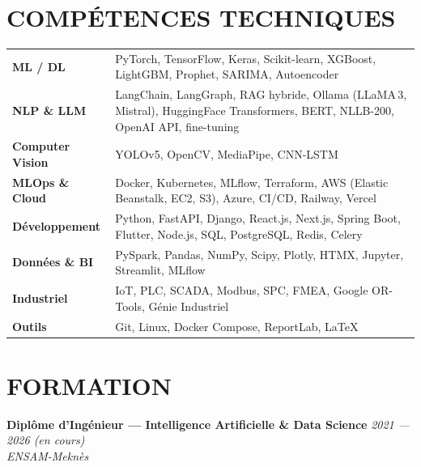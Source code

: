 \documentclass[10pt, a4paper]{article}
\newcommand{\expentry}[3]{%
  \textbf{\normalsize #1} \hfill {\small\color{muted}\textit{#3}}\\
  {\small\color{accent}\textit{#2}}%
}
\begin{document}
\section{COMPÉTENCES TECHNIQUES}

\begin{tabularx}{\linewidth}{@{} l X @{}}
  \textbf{ML / DL}
    & PyTorch, TensorFlow, Keras, Scikit-learn, XGBoost, LightGBM, Prophet, SARIMA, Autoencoder \\[3pt]

  \textbf{NLP \& LLM}
    & LangChain, LangGraph, RAG hybride, Ollama (LLaMA\,3, Mistral), HuggingFace Transformers, BERT, NLLB-200, OpenAI API, fine-tuning \\[3pt]

  \textbf{Computer Vision}
    & YOLOv5, OpenCV, MediaPipe, CNN-LSTM \\[3pt]

  \textbf{MLOps \& Cloud}
    & Docker, Kubernetes, MLflow, Terraform, AWS (Elastic Beanstalk, EC2, S3), Azure, CI/CD, Railway, Vercel \\[3pt]

  \textbf{Développement}
    & Python, FastAPI, Django, React.js, Next.js, Spring Boot, Flutter, Node.js, SQL, PostgreSQL, Redis, Celery \\[3pt]

  \textbf{Données \& BI}
    & PySpark, Pandas, NumPy, Scipy, Plotly, HTMX, Jupyter, Streamlit, MLflow \\[3pt]

  \textbf{Industriel}
    & IoT, PLC, SCADA, Modbus, SPC, FMEA, Google OR-Tools, Génie Industriel \\[3pt]

  \textbf{Outils}
    & Git, Linux, Docker Compose, ReportLab, LaTeX
\end{tabularx}

\section{FORMATION}

\expentry{Diplôme d'Ingénieur — Intelligence Artificielle \& Data Science}
         {ENSAM-Meknès}
         {2021 — 2026 (en cours)}
\end{document}
